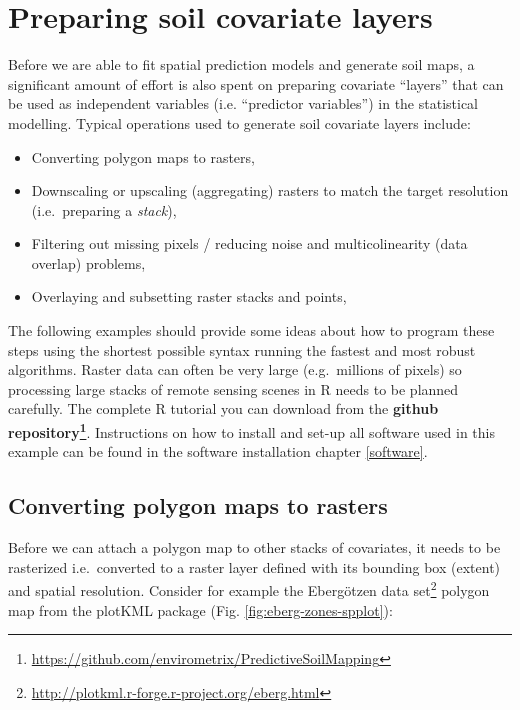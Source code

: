 \documentclass[11pt]{krantz}
\renewcommand{\href}[2]{#2\footnote{\url{#1}}}
\theoremstyle{definition}
\theoremstyle{definition}
\theoremstyle{definition}
\theoremstyle{remark}
\begin{document}
\hypertarget{preparing-soil-covariate-layers}{%
\section{Preparing soil covariate
layers}\label{preparing-soil-covariate-layers}}

Before we are able to fit spatial prediction models and generate soil
maps, a significant amount of effort is also spent on preparing
covariate ``layers'' that can be used as independent variables (i.e.
``predictor variables'') in the statistical modelling. Typical
operations used to generate soil covariate layers include:

\begin{itemize}
\item
  Converting polygon maps to rasters,
\item
  Downscaling or upscaling (aggregating) rasters to match the target
  resolution (i.e.~preparing a \emph{stack}),
\item
  Filtering out missing pixels / reducing noise and multicolinearity
  (data overlap) problems,
\item
  Overlaying and subsetting raster stacks and points,
\end{itemize}

The following examples should provide some ideas about how to program
these steps using the shortest possible syntax running the fastest and
most robust algorithms. Raster data can often be very large
(e.g.~millions of pixels) so processing large stacks of remote sensing
scenes in R needs to be planned carefully. The complete R tutorial you
can download from the
\textbf{\href{https://github.com/envirometrix/PredictiveSoilMapping}{github
repository}}. Instructions on how to install and set-up all software
used in this example can be found in the software installation chapter
\ref{software}.

\hypertarget{converting-polygon-maps-to-rasters}{%
\subsection{Converting polygon maps to
rasters}\label{converting-polygon-maps-to-rasters}}

Before we can attach a polygon map to other stacks of covariates, it
needs to be rasterized i.e.~converted to a raster layer defined with its
bounding box (extent) and spatial resolution. Consider for example the
\href{http://plotkml.r-forge.r-project.org/eberg.html}{Ebergötzen data
set} polygon map from the plotKML package (Fig.
\ref{fig:eberg-zones-spplot}):
\end{document}
